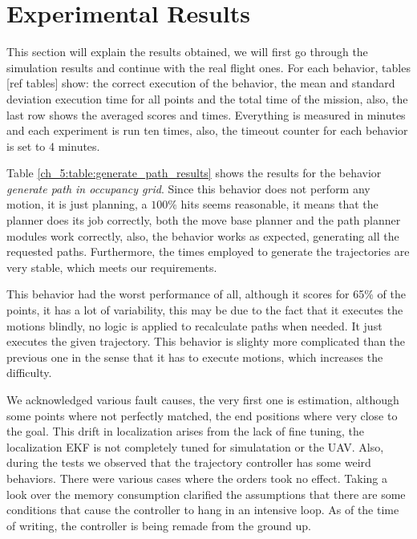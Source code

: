 \section{Experimental Results} \label{ch_5:sect:results}

  This section will explain the results obtained, we will first go through the simulation results and continue with the real flight ones. For each behavior, tables [ref tables] show: the correct execution of the behavior, the mean and standard deviation execution time for all points and the total time of the mission, also, the last row shows the averaged scores and times. Everything is measured in minutes and each experiment is run ten times, also, the timeout counter for each behavior is set to 4 minutes.
 
  

  Table \ref{ch_5:table:generate_path_results} shows the results for the behavior \textit{generate path in occupancy grid}. Since this behavior does not perform any motion, it is just planning, a $100\%$ hits seems reasonable, it means that the planner does its job correctly, both the move base planner and the path planner modules work correctly, also, the behavior works as expected, generating all the requested paths. Furthermore, the times employed to generate the trajectories are very stable, which meets our requirements. 

  

  This behavior had the worst performance of all, although it scores for 65\% of the points, it has a lot of variability, this may be due to the fact that it executes the motions blindly, no logic is applied to recalculate paths when needed. It just executes the given trajectory. This behavior is slighty more complicated than the previous one in the sense that it has to execute motions, which increases the difficulty.

  We acknowledged various fault causes, the very first one is estimation, although some points where not perfectly matched, the end positions where very close to the goal. This drift in localization arises from the lack of fine tuning, the localization EKF is not completely tuned for simulatation or the UAV. Also, during the tests we observed that the trajectory controller has some weird behaviors. There were various cases where the orders took no effect. Taking a look over the memory consumption clarified the assumptions that there are some conditions that cause the controller to hang in an intensive loop. As of the time of writing, the controller is being remade from the ground up.

